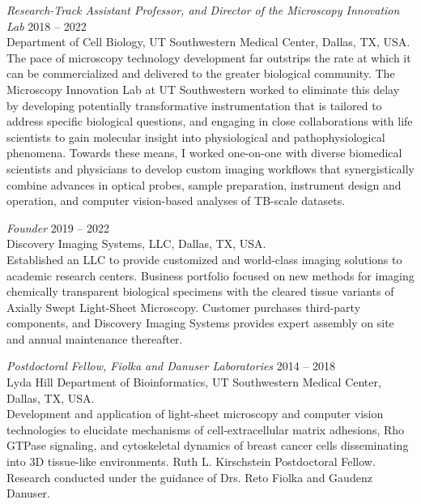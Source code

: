 {\sl Research-Track Assistant Professor, and Director of the Microscopy Innovation Lab} \hfill 2018 -- 2022 \\ 
Department of Cell Biology, UT Southwestern Medical Center, Dallas, TX, USA. \hfill \\
\forceindent The pace of microscopy technology development far outstrips the rate at which it can be commercialized and delivered to the greater biological community.  The Microscopy Innovation Lab at UT Southwestern worked to eliminate this delay by developing potentially transformative instrumentation that is tailored to address specific biological questions, and engaging in close collaborations with life scientists to gain molecular insight into physiological and pathophysiological phenomena. Towards these means, I worked one-on-one with diverse biomedical scientists and physicians to develop custom imaging workflows that synergistically combine advances in optical probes, sample preparation, instrument design and operation, and computer vision-based analyses of TB-scale datasets. 

{\sl Founder} \hfill 2019 -- 2022 \\ 
Discovery Imaging Systems, LLC, Dallas, TX, USA. \hfill \\
\forceindent Established an LLC to provide customized and world-class imaging solutions to academic research centers.  Business portfolio focused on new methods for imaging chemically transparent biological specimens with the cleared tissue variants of Axially Swept Light-Sheet Microscopy.  Customer purchases third-party components, and Discovery Imaging Systems provides expert assembly on site and annual maintenance thereafter.

{\sl Postdoctoral Fellow, Fiolka and Danuser Laboratories} \hfill 2014 -- 2018 \\ 
Lyda Hill Department of Bioinformatics, UT Southwestern Medical Center, Dallas, TX, USA. \hfill \\
\forceindent Development and application of light-sheet microscopy and computer vision technologies to elucidate mechanisms of cell-extracellular matrix adhesions, Rho GTPase signaling, and cytoskeletal dynamics of breast cancer cells disseminating into 3D tissue-like environments. Ruth L. Kirschstein Postdoctoral Fellow.  Research conducted under the guidance of Drs. Reto Fiolka and Gaudenz Danuser.

